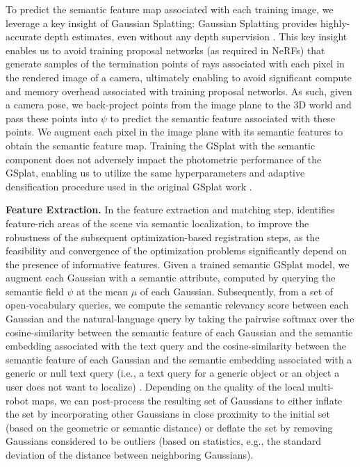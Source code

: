 To predict the semantic feature map associated with each training image, we leverage a key insight of Gaussian Splatting: Gaussian Splatting provides highly-accurate depth estimates, even without any depth supervision \cite{huang20242d}. This key insight enables us to avoid training proposal networks (as required in NeRFs) that generate samples of the termination points of rays associated with each pixel in the rendered image of a camera, ultimately enabling \algname to avoid significant compute and memory overhead associated with training proposal networks.
As such, given a camera pose, we back-project points from the image plane to the $3$D world and pass these points into $\psi$ to predict the semantic feature associated with these points. We augment each pixel in the image plane with its semantic features to obtain the semantic feature map. Training the GSplat with the semantic component does not adversely impact the photometric performance of the GSplat, enabling us to utilize the same hyperparameters and adaptive densification procedure used in the original GSplat work \cite{kerbl20233d}.

\smallskip
\noindent\textbf{Feature Extraction.}
In the feature extraction and matching step, \algname identifies feature-rich areas of the scene via semantic localization, to improve the robustness of the subsequent optimization-based registration steps, as the feasibility and convergence of the optimization problems significantly depend on the presence of informative features.
Given a trained semantic GSplat model, we augment each Gaussian with a semantic attribute, computed by querying the semantic field $\psi$ at the mean $\mu$ of each Gaussian. Subsequently, from a set of open-vocabulary queries, we compute the semantic relevancy score between each Gaussian and the natural-language query by taking the pairwise softmax over the cosine-similarity between the semantic feature of each Gaussian and the semantic embedding associated with the text query and the cosine-similarity between the semantic feature of each Gaussian and the semantic embedding associated with a generic or null text query (i.e., a text query for a generic object or an object a user does not want to localize) \cite{kerr2023lerf}. Depending on the quality of the local multi-robot maps, we can post-process the resulting set of Gaussians to either inflate the set by incorporating other Gaussians in close proximity to the initial set (based on the geometric or semantic distance) or deflate the set by removing Gaussians considered to be outliers (based on statistics, e.g., the standard deviation of the distance between neighboring Gaussians).

